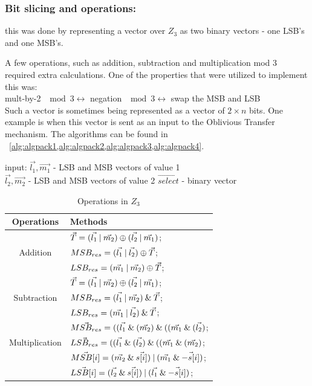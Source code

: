 \subsubsection{Bit slicing and operations:} this was done by representing a vector over $Z_3$  as two binary vectors - one LSB's and one MSB's. 

A few operations, such as addition, subtraction and multiplication mod 3 required extra calculations. One of the properties that were utilized to implement this was:\\
mult-by-2 $\mod 3  \leftrightarrow$ negation $ \mod 3 \leftrightarrow$ swap the MSB and LSB\\

Such a vector is sometimes being represented as a vector of $2 \times n$ bits. One example is when this vector is sent as an input to the Oblivious Transfer mechanism. 
The algorithms can be found in ~\cref{alg:algpack1,alg:algpack2,alg:algpack3,alg:algpack4}.


input:   $\vec{l_1}, \vec{m_1}$ - LSB and MSB vectors of value 1  \\
					$\vec{l_2}, \vec{m_2}$ - LSB and MSB vectors of value 2
					$\vec{select}$ - binary vector

\begin{table}[ht]
\caption{Operations in $Z_3$}
\begin{center}
\begin{tabular}{|c|l|}
    \hline
    \textbf{Operations} & \textbf{Methods}\\
    \hline
    \multirow{3}{*}{Addition} & $\vec{T} = (\vec{l_1} \mathbin{|} \vec{m_2}) \oplus (\vec{l_2} \mathbin{|} \vec{m_1})$;\\
    & $MSB_{res} = ( \vec{l_1} \mathbin{|} \vec{l_2} ) \oplus  \vec{T} $; \\
    & $LSB_{res} = (\vec{m_1} \mathbin{|} \vec{m_2} ) \oplus \vec{T} $; \\
    \hline
    \multirow{3}{*}{Subtraction} & $\vec{T} = (\vec{l_1} \mathbin{|} \vec{m_2}) \oplus (\vec{l_2} \mathbin{|} \vec{m_1})$;\\
    & $MSB_{res} = (\vec{l_1} \mathbin{|} \vec{m_2} ) \mathbin{\&} \vec{T}$;\\
    & $LSB_{res} = (\vec{m_1} \mathbin{|} \vec{l_2} ) \mathbin{\&} \vec{T}$; \\
    \hline
\multirow{3}{*}{Multiplication} & $\vec{MSB_{res}}= ((\vec{l_1} \mathbin{\&} (\vec{m_2}) \mathbin{\&}     ((\vec{m_1} \mathbin{\&} (\vec{l_2})$; \\
    & $\vec{LSB_{res}} = ((\vec{l_1} \mathbin{\&} (\vec{l_2}) \mathbin{\&}     ((\vec{m_1} \mathbin{\&} (\vec{m_2})$;\\
    \hline
\multirow{3}{*}{MUX} & $\vec{MSB[i]} =( \vec{m_2} \mathbin{\&} \vec{s[i]}) \mathbin{|} (\vec{m_1} \mathbin{\&} \vec{- s[i]})$; \\
    & $\vec{LSB[i]} =( \vec{l_2} \mathbin{\&} \vec{s[i]}) \mathbin{|} (\vec{l_1} \mathbin{\&} \vec{- s[i]})$; \\
    \hline

\end{tabular}
\end{center}
\label{tab:multicol}
\end{table}

